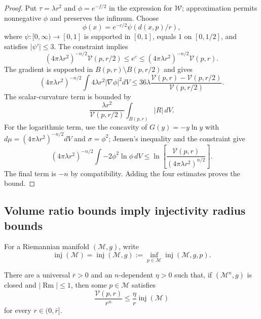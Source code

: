 \begin{proof}
\sketch Put $\tau=\lambda r^2$ and $\phi=e^{-f/2}$ in the expression for
$\mathcal W$; approximation permits nonnegative $\phi$ and preserves the
infimum. Choose
\[
\phi(x)=e^{-c/2}\psi(d(x,p)/r),
\]
where $\psi:[0,\infty)\to[0,1]$ is supported in $[0,1]$, equals $1$ on
$[0,1/2]$, and satisfies $|\psi'|\leq3$. The constraint implies
\[
(4\pi\lambda r^2)^{-n/2}\mathcal V(p,r/2)
\leq e^c\leq
(4\pi\lambda r^2)^{-n/2}\mathcal V(p,r).
\]
The gradient is supported in $B(p,r)\setminus B(p,r/2)$ and gives
\[
(4\pi\lambda r^2)^{-n/2}\int4\lambda r^2|\nabla\phi|^2dV
\leq36\lambda\frac{\mathcal V(p,r)-\mathcal V(p,r/2)}{\mathcal V(p,r/2)}.
\]
The scalar-curvature term is bounded by
\[
\frac{\lambda r^2}{\mathcal V(p,r/2)}\int_{B(p,r)}|R|\,dV.
\]
For the logarithmic term, use the concavity of $G(y)=-y\ln y$ with
$d\mu=(4\pi\lambda r^2)^{-n/2}dV$ and $\sigma=\phi^2$; Jensen's inequality
and the constraint give
\[
(4\pi\lambda r^2)^{-n/2}\int-2\phi^2\ln\phi\,dV
\leq\ln\left[\frac{\mathcal V(p,r)}{(4\pi\lambda r^2)^{n/2}}\right].
\]
The final term is $-n$ by compatibility. Adding the four estimates proves
the bound.
\end{proof}

\subsection{Volume ratio bounds imply injectivity radius bounds}

For a Riemannian manifold $(\mathcal M,g)$, write
\[
\operatorname{inj}(\mathcal M)=\operatorname{inj}(\mathcal M,g)
:=\inf_{p\in\mathcal M}\operatorname{inj}(\mathcal M,g,p).
\]

\begin{lemma}
\label{topping-ch8-volume-ratio-inj-estimate}

There are a universal $\bar r>0$ and an $n$-dependent $\eta>0$ such that,
if $(\mathcal M^n,g)$ is closed and $|\operatorname{Rm}|\leq1$, then some
$p\in\mathcal M$ satisfies
\[
\frac{\mathcal V(p,r)}{r^n}\leq\frac\eta r\operatorname{inj}(\mathcal M)
\]
for every $r\in(0,\bar r]$.
\end{lemma}

